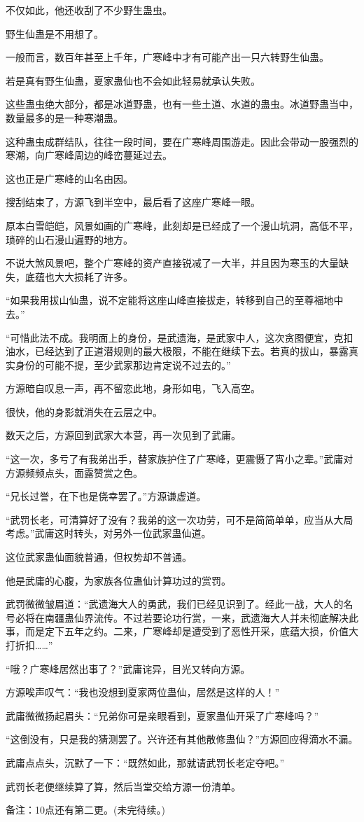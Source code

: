 \begin{this_body}
不仅如此，他还收刮了不少野生蛊虫。

野生仙蛊是不用想了。

一般而言，数百年甚至上千年，广寒峰中才有可能产出一只六转野生仙蛊。

若是真有野生仙蛊，夏家蛊仙也不会如此轻易就承认失败。

这些蛊虫绝大部分，都是冰道野蛊，也有一些土道、水道的蛊虫。冰道野蛊当中，数量最多的是一种寒潮蛊。

这种蛊虫成群结队，往往一段时间，要在广寒峰周围游走。因此会带动一股强烈的寒潮，向广寒峰周边的峰峦蔓延过去。

这也正是广寒峰的山名由因。

搜刮结束了，方源飞到半空中，最后看了这座广寒峰一眼。

原本白雪皑皑，风景如画的广寒峰，此刻却是已经成了一个漫山坑洞，高低不平，琐碎的山石漫山遍野的地方。

不说大煞风景吧，整个广寒峰的资产直接锐减了一大半，并且因为寒玉的大量缺失，底蕴也大大损耗了许多。

“如果我用拔山仙蛊，说不定能将这座山峰直接拔走，转移到自己的至尊福地中去。”

“可惜此法不成。我明面上的身份，是武遗海，是武家中人，这次贪图便宜，克扣油水，已经达到了正道潜规则的最大极限，不能在继续下去。若真的拔山，暴露真实身份的可能不提，至少武家那边肯定说不过去的。”

方源暗自叹息一声，再不留恋此地，身形如电，飞入高空。

很快，他的身影就消失在云层之中。

数天之后，方源回到武家大本营，再一次见到了武庸。

“这一次，多亏了有我弟出手，替家族护住了广寒峰，更震慑了宵小之辈。”武庸对方源频频点头，面露赞赏之色。

“兄长过誉，在下也是侥幸罢了。”方源谦虚道。

“武罚长老，可清算好了没有？我弟的这一次功劳，可不是简简单单，应当从大局考虑。”武庸这时转头，对另外一位武家蛊仙道。

这位武家蛊仙面貌普通，但权势却不普通。

他是武庸的心腹，为家族各位蛊仙计算功过的赏罚。

武罚微微皱眉道：“武遗海大人的勇武，我们已经见识到了。经此一战，大人的名号必将在南疆蛊仙界流传。不过若要论功行赏，一来，武遗海大人并未彻底解决此事，而是定下五年之约。二来，广寒峰却是遭受到了恶性开采，底蕴大损，价值大打折扣……”

“哦？广寒峰居然出事了？”武庸诧异，目光又转向方源。

方源唉声叹气：“我也没想到夏家两位蛊仙，居然是这样的人！”

武庸微微扬起眉头：“兄弟你可是亲眼看到，夏家蛊仙开采了广寒峰吗？”

“这倒没有，只是我的猜测罢了。兴许还有其他散修蛊仙？”方源回应得滴水不漏。

武庸点点头，沉默了一下：“既然如此，那就请武罚长老定夺吧。”

武罚长老便继续算了算，然后当堂交给方源一份清单。

备注：10点还有第二更。(未完待续。)

\end{this_body}

